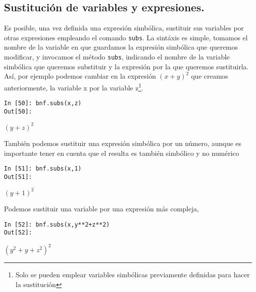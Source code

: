\begin{paracol}{2}
\subsection{Sustitución de variables y expresiones.}
Es posible, una vez definida una expresión simbólica, sustituir sus variables por otras expresiones empleando el comando \texttt{subs}. La sintáxis es simple, tomamos el nombre de la variable en que guardamos la expresión simbólica que queremos modificar, y invocamos el método \texttt{subs}, indicando el nombre de la variable simbólica que queremos substituir y la expresión por la que queremos sustituirla. Así, por ejemplo podemos cambiar en la expresión $(x+y)^2$ que creamos anteriormente, la variable x por la variable z\footnote{Solo se pueden emplear variables simbólicas previamente definidas para hacer la sustitución}. 
\end{paracol}
\begin{center}
	\begin{minipage}{.25\textwidth}
		\begin{verbatim}
In [50]: bnf.subs(x,z)
Out[50]:
		\end{verbatim}
		$(y+z)^2$
	\end{minipage}
\end{center}

\begin{paracol}{2}
También podemos sustituir una expresión simbólica por un número, aunque es importante tener en cuenta que el resulta es también simbólico y no numérico
\end{paracol}
\begin{center}
	\begin{minipage}{.25\textwidth}
		\begin{verbatim}
In [51]: bnf.subs(x,1)
Out[51]: 
		\end{verbatim}
		$(y+1)^2$
	\end{minipage}
\end{center}
\begin{paracol}{2}
Podemos sustituir una variable por una expresión más compleja,
\end{paracol}
\begin{center}
	\begin{minipage}{.25\textwidth}
		\begin{verbatim}
In [52]: bnf.subs(x,y**2+z**2)
Out[52]:
\end{verbatim}
		$(y^2+y+z^2)^2$
	\end{minipage}
\end{center}

